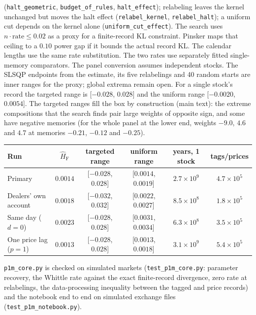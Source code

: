 \documentclass[12pt]{article}
\theoremstyle{definition}
\theoremstyle{remark}
\begin{document}
(\nolinkurl{halt_geometric}, \nolinkurl{budget_of_rules}, \nolinkurl{halt_effect}); relabeling leaves the kernel unchanged but moves the halt effect (\nolinkurl{relabel_kernel}, \nolinkurl{relabel_halt}); a uniform cut depends on the kernel alone (\nolinkurl{uniform_cut_effect}). The search uses $n\cdot\mathrm{rate}\le0.02$ as a proxy for a finite-record KL constraint. Pinsker maps that ceiling to a $0.10$ power gap if it bounds the actual record KL. The calendar lengths use the same rate substitution. The two rates use separately fitted single-memory comparators. The panel conversion assumes independent stocks. The SLSQP endpoints from the estimate, its five relabelings and 40 random starts are inner ranges for the proxy; global extrema remain open. For a single stock's record the targeted range is [$-0.028$, $0.028$] and the uniform range [$-0.0020$, $0.0054$]. The targeted ranges fill the box by construction (main text): the extreme compositions that the search finds pair large weights of opposite sign, and some have negative memories (for the whole panel at the lower end, weights $-9.0$, $4.6$ and $4.7$ at memories $-0.21$, $-0.12$ and $-0.25$).

\begin{center}\footnotesize\setlength{\tabcolsep}{4pt}
\begin{tabular}{lccccc}\toprule
Run & $\hat H_{\mathrm{F}}$ & targeted range & uniform range & years, 1 stock & tags/prices\\\midrule
Primary & $0.0014$ & [$-0.028$, $0.028$] & [$0.0014$, $0.0019$] & $2.7\times10^{9}$ & $4.7\times10^{5}$\\
Dealers' own account & $0.0018$ & [$-0.032$, $0.032$] & [$0.0022$, $0.0027$] & $8.5\times10^{8}$ & $1.8\times10^{5}$\\
Same day ($d=0$) & $0.0023$ & [$-0.028$, $0.028$] & [$0.0031$, $0.0034$] & $6.3\times10^{8}$ & $3.5\times10^{5}$\\
One price lag ($p=1$) & $0.0013$ & [$-0.028$, $0.028$] & [$0.0013$, $0.0018$] & $3.1\times10^{9}$ & $5.4\times10^{5}$\\
\bottomrule\end{tabular}
\end{center}

\nolinkurl{p1m_core.py} is checked on simulated markets (\nolinkurl{test_p1m_core.py}: parameter recovery, the Whittle rate against the exact finite-record divergence, zero rate at relabelings, the data-processing inequality between the tagged and price records) and the notebook end to end on simulated exchange files (\nolinkurl{test_p1m_notebook.py}).
\end{document}
